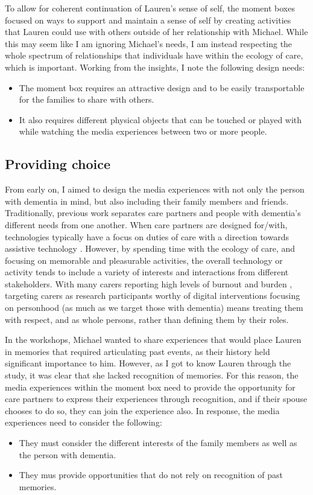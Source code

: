 To allow for coherent continuation of Lauren’s sense of self, the moment boxes focused on ways to support and maintain a sense of self by creating activities that Lauren could use with others outside of her relationship with Michael. While this may seem like I am ignoring Michael’s needs, I am instead respecting the whole spectrum of relationships that individuals have within the ecology of care, which is important. Working from the insights, I note the following design needs:
\begin{itemize}
    \item The moment box requires an attractive design and to be easily transportable for the families to share with others.
    \item It also requires different physical objects that can be touched or played with while watching the media experiences between two or more people. 
\end{itemize}

\subsection{Providing choice}
\label{DR:ProvidingChoice}
From early on, I aimed to design the media experiences with not only the person with dementia in mind, but also including their family members and friends. Traditionally, previous work separates care partners and people with dementia's different needs from one another. When care partners are designed for/with, technologies typically have a focus on duties of care with a direction towards assistive technology \citep{bennett_assistive_2017,bharucha2009intelligent,gibson2015everyday}. However, by spending time with the ecology of care, and focusing on memorable and pleasurable activities, the overall technology or activity tends to include a variety of interests and interactions from different stakeholders. With many carers reporting high levels of burnout and burden \citep{takai_experience_2009}, targeting carers as research participants worthy of digital interventions focusing on personhood (as much as we target those with dementia) means treating them with respect, and as whole persons, rather than defining them by their roles.

In the workshops, Michael wanted to share experiences that would place Lauren in memories that required articulating past events, as their history held significant importance to him. However, as I got to know Lauren through the study, it was clear that she lacked recognition of memories. For this reason, the media experiences within the moment box need to provide the opportunity for care partners to express their experiences through recognition, and if their spouse chooses to do so, they can join the experience also. In response, the media experiences need to consider the following:
\begin{itemize}
    \item They must consider the different interests of the family members as well as the person with dementia. 
    \item They mus provide opportunities that do not rely on recognition of past memories.
\end{itemize}

